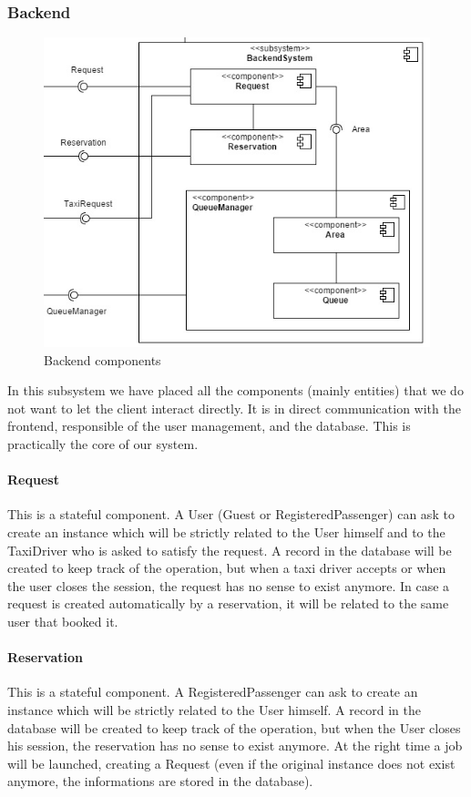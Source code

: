 	\subsubsection{Backend}
		\begin{figure}[h!]
			\begin{center}
				\includegraphics[width=1\linewidth]{../SE2_IMAGES/Backend}
				\caption{Backend components}
			\end{center}
		\end{figure}
		In this subsystem we have placed all the components (mainly entities) that we do not want to let the client
		interact directly. It is in direct communication with the frontend, responsible of the user
		management, and the database. This is practically the core of our system.
		\paragraph{Request}
		This is a stateful component. A User (Guest or RegisteredPassenger) can ask to create an instance
		which will be strictly related to the User himself and to the TaxiDriver who is asked to satisfy the
		request. A record in the database will be created to keep track of the operation, but when a taxi
		driver accepts or when the user closes the session, the request has no sense to exist anymore.
		In case a request is created automatically by a reservation, it will be related to the same user that booked it.
		\paragraph{Reservation}
		This is a stateful component. A RegisteredPassenger can ask to create an instance
		which will be strictly related to the User himself. A record in the database will be created to
		keep track of the operation, but when the User closes his session, the reservation has no sense to exist
		anymore. At the right time a job will be launched, creating a Request (even if the original instance
		does not exist anymore, the informations are stored in the database).
